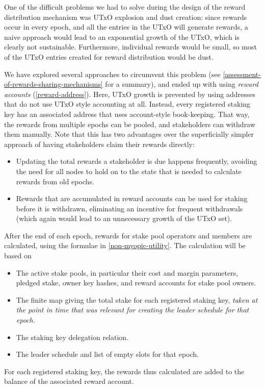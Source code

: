 \documentclass[11pt,a4paper]{article}
\begin{document}
One of the difficult problems we had to solve during the design of the
reward distribution mechanism was UTxO explosion and dust creation:
since rewards occur in every epoch, and all the entries in the UTxO
will generate rewards, a naive approach would lead to an exponential
growth of the UTxO, which is clearly not sustainable. Furthermore,
individual rewards would be small, so most of the UTxO entries created
for reward distribution would be dust.

We have explored several approaches to circumvent this problem
(see \cref{assessment-of-rewards-sharing-mechanisms} for a summary),
and ended up with using \emph{reward accounts}
(\cref{reward-address}). Here, UTxO growth is prevented by using
addresses that do not use UTxO style accounting at all. Instead, every
registered staking key has an associated address that uses
account-style book-keeping. That way, the rewards from multiple epochs
can be pooled, and stakeholders can withdraw them manually. Note that
this has two advantages over the superficially simpler approach of
having stakeholders claim their rewards directly:
\begin{itemize}
\item Updating the total rewards a stakeholder is due happens
  frequently, avoiding the need for all nodes to hold on to the state
  that is needed to calculate rewards from old epochs.
\item Rewards that are accumulated in reward accounts can be used for
  staking before it is withdrawn, eliminating an incentive for
  frequent withdrawals (which again would lead to an unnecessary
  growth of the UTxO set).
\end{itemize}

After the end of each epoch, rewards for stake pool operators and members are
calculated, using the formulae in \cref{non-myopic-utility}. The calculation
will be based on
\begin{itemize}
\item The active stake pools, in particular their cost and margin parameters,
  pledged stake, owner key hashes, and reward accounts for stake pool owners.
\item The finite map giving the total stake for each registered
  staking key, \emph{taken at the point in time that was relevant for
    creating the leader schedule for that epoch}.
\item The staking key delegation relation.
\item The leader schedule and list of empty slots for that epoch.
\end{itemize}
For each registered staking key, the rewards thus calculated are added
to the balance of the associated reward account.
\end{document}
